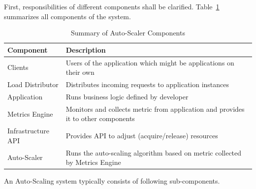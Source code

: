 First, responsibilities of different components shall be clarified. Table~\ref{tab:auto-scaler-sum} summarizes all components of the system.
\begin{table}[h!]
    \begin{tabular}{ll}
        \toprule
        \textbf{Component} & \textbf{Description}\\
        \midrule
        Clients & Users of the application which might be applications on their own\\
        Load Distributor & Distributes incoming requests to application instances\\
        Application & Runs business logic defined by developer\\
        Metrics Engine & Monitors and collects metric from application and provides it to other components\\
        Infrastructure API & Provides API to adjust (acquire/release) resources\\
        Auto-Scaler & Runs the auto-scaling algorithm based on metric collected by Metrics Engine\\
        \bottomrule
    \end{tabular}
    \centering
    \caption{Summary of Auto-Scaler Components}
    \label{tab:auto-scaler-sum}
\end{table}
An Auto-Scaling system typically consists of following sub-components.

